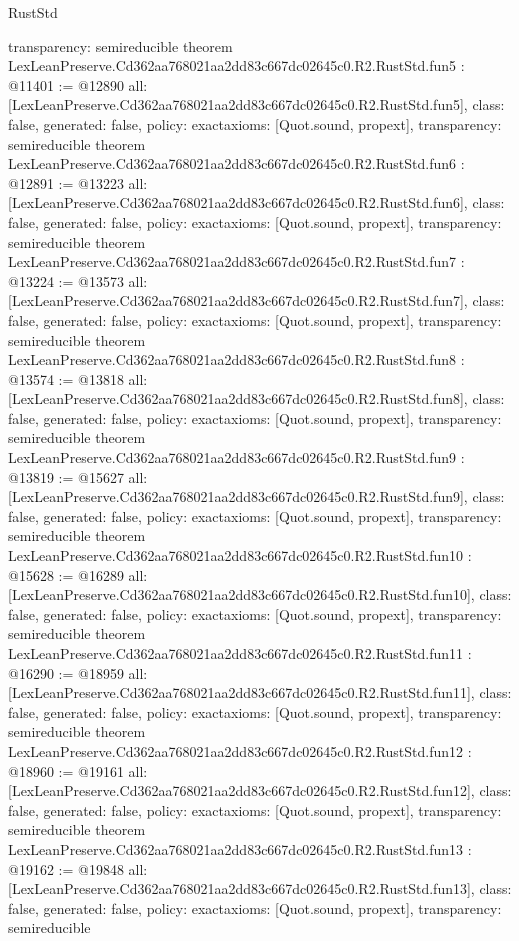 \begin{lexlean}{RustStd}
\begin{coremodule}
{  transparency: semireducible
}
theorem LexLeanPreserve.Cd362aa768021aa2dd83c667dc02645c0.R2.RustStd.fun5 : @11401 := @12890 {
  all: [LexLeanPreserve.Cd362aa768021aa2dd83c667dc02645c0.R2.RustStd.fun5],
  class: false,
  generated: false,
  policy: exact{axioms: [Quot.sound, propext]},
  transparency: semireducible
}
theorem LexLeanPreserve.Cd362aa768021aa2dd83c667dc02645c0.R2.RustStd.fun6 : @12891 := @13223 {
  all: [LexLeanPreserve.Cd362aa768021aa2dd83c667dc02645c0.R2.RustStd.fun6],
  class: false,
  generated: false,
  policy: exact{axioms: [Quot.sound, propext]},
  transparency: semireducible
}
theorem LexLeanPreserve.Cd362aa768021aa2dd83c667dc02645c0.R2.RustStd.fun7 : @13224 := @13573 {
  all: [LexLeanPreserve.Cd362aa768021aa2dd83c667dc02645c0.R2.RustStd.fun7],
  class: false,
  generated: false,
  policy: exact{axioms: [Quot.sound, propext]},
  transparency: semireducible
}
theorem LexLeanPreserve.Cd362aa768021aa2dd83c667dc02645c0.R2.RustStd.fun8 : @13574 := @13818 {
  all: [LexLeanPreserve.Cd362aa768021aa2dd83c667dc02645c0.R2.RustStd.fun8],
  class: false,
  generated: false,
  policy: exact{axioms: [Quot.sound, propext]},
  transparency: semireducible
}
theorem LexLeanPreserve.Cd362aa768021aa2dd83c667dc02645c0.R2.RustStd.fun9 : @13819 := @15627 {
  all: [LexLeanPreserve.Cd362aa768021aa2dd83c667dc02645c0.R2.RustStd.fun9],
  class: false,
  generated: false,
  policy: exact{axioms: [Quot.sound, propext]},
  transparency: semireducible
}
theorem LexLeanPreserve.Cd362aa768021aa2dd83c667dc02645c0.R2.RustStd.fun10 : @15628 := @16289 {
  all: [LexLeanPreserve.Cd362aa768021aa2dd83c667dc02645c0.R2.RustStd.fun10],
  class: false,
  generated: false,
  policy: exact{axioms: [Quot.sound, propext]},
  transparency: semireducible
}
theorem LexLeanPreserve.Cd362aa768021aa2dd83c667dc02645c0.R2.RustStd.fun11 : @16290 := @18959 {
  all: [LexLeanPreserve.Cd362aa768021aa2dd83c667dc02645c0.R2.RustStd.fun11],
  class: false,
  generated: false,
  policy: exact{axioms: [Quot.sound, propext]},
  transparency: semireducible
}
theorem LexLeanPreserve.Cd362aa768021aa2dd83c667dc02645c0.R2.RustStd.fun12 : @18960 := @19161 {
  all: [LexLeanPreserve.Cd362aa768021aa2dd83c667dc02645c0.R2.RustStd.fun12],
  class: false,
  generated: false,
  policy: exact{axioms: [Quot.sound, propext]},
  transparency: semireducible
}
theorem LexLeanPreserve.Cd362aa768021aa2dd83c667dc02645c0.R2.RustStd.fun13 : @19162 := @19848 {
  all: [LexLeanPreserve.Cd362aa768021aa2dd83c667dc02645c0.R2.RustStd.fun13],
  class: false,
  generated: false,
  policy: exact{axioms: [Quot.sound, propext]},
  transparency: semireducible
}
\end{coremodule}
\end{lexlean}
